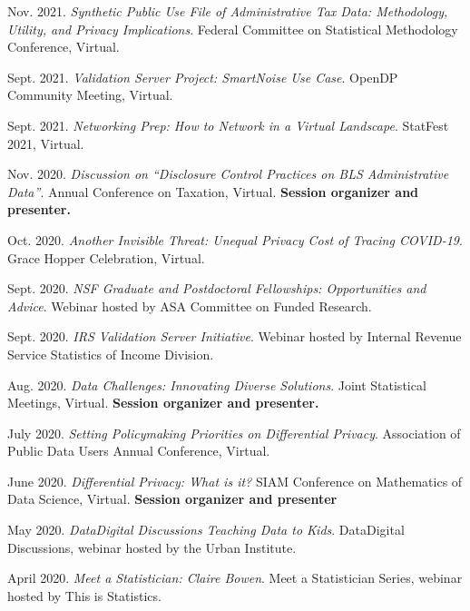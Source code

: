 \documentclass[11pt, letterpaper, roman]{moderncv} %
\begin{document}
\begin{etaremune}[topsep=0pt, itemsep=4pt, partopsep=0pt, parsep=0pt]
    \item Nov. 2021. \textit{Synthetic Public Use File of Administrative Tax Data: Methodology, Utility, and Privacy Implications}. Federal Committee on Statistical Methodology Conference, Virtual.
    
    \item Sept. 2021. \textit{Validation Server Project: SmartNoise Use Case}. OpenDP Community Meeting, Virtual.
    
    \item Sept. 2021. \textit{Networking Prep: How to Network in a Virtual Landscape}. StatFest 2021, Virtual.
    
    \item Nov. 2020. \textit{Discussion on ``Disclosure Control Practices on BLS Administrative Data''}. Annual Conference on Taxation, Virtual. \textbf{Session organizer and presenter.}
    
    \item Oct. 2020. \textit{Another Invisible Threat: Unequal Privacy Cost of Tracing COVID-19}. Grace Hopper Celebration, Virtual.
    
    \item Sept. 2020. \textit{NSF Graduate and Postdoctoral Fellowships: Opportunities and Advice}. Webinar hosted by ASA Committee on Funded Research.
    
    \item Sept. 2020. \textit{IRS Validation Server Initiative}. Webinar hosted by Internal Revenue Service Statistics of Income Division.
    
    \item Aug. 2020. \textit{Data Challenges: Innovating Diverse Solutions}. Joint Statistical Meetings, Virtual. \textbf{Session organizer and presenter.}
    
    \item July 2020. \textit{Setting Policymaking Priorities on Differential Privacy}. Association of Public Data Users Annual Conference, Virtual.
    
    \item June 2020. \textit{Differential Privacy: What is it?} SIAM Conference on Mathematics of Data Science, Virtual. \textbf{Session organizer and presenter}
    
    \item May 2020. \textit{Data\@Urban Digital Discussions Teaching Data to Kids}. Data\@Urban Digital Discussions, webinar hosted by the Urban Institute.
    
    \item April 2020. \textit{Meet a Statistician: Claire Bowen}. Meet a Statistician Series, webinar hosted by This is Statistics.
    

\end{etaremune}
\end{document}
